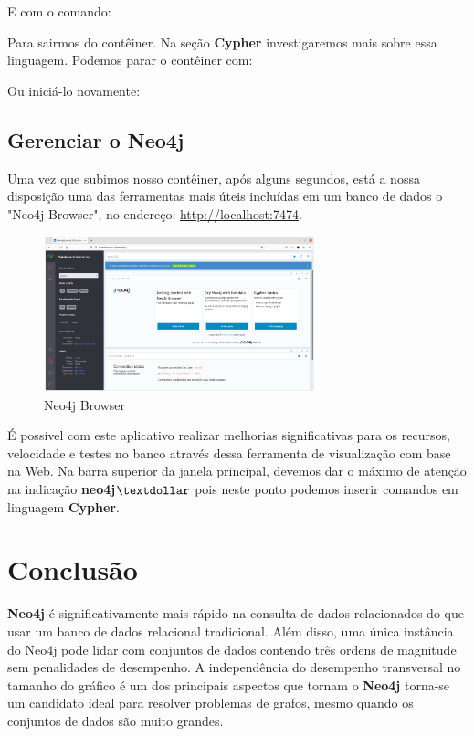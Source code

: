 \documentclass[a4paper,11pt]{article}
\begin{document}
E com o comando: \\

Para sairmos do contêiner. Na seção \textbf{Cypher} investigaremos mais sobre essa linguagem. Podemos parar o contêiner com: \\

Ou iniciá-lo novamente: \\

\subsection{Gerenciar o Neo4j}
Uma vez que subimos nosso contêiner, após alguns segundos, está a nossa disposição uma das ferramentas mais úteis incluídas em um banco de dados o "Neo4j Browser", no endereço: \url{http://localhost:7474}.
\begin{figure}[H]
	\centering
	\includegraphics[width=0.7\textwidth]{imagens/browser}
	\caption{Neo4j Browser}
\end{figure}

É possível com este aplicativo realizar melhorias significativas para os recursos, velocidade e testes no banco através dessa ferramenta de visualização com base na Web. Na barra superior da janela principal, devemos dar o máximo de atenção na indicação \textbf{neo4j$\textdollar$ }pois neste ponto podemos inserir comandos em linguagem \textbf{Cypher}.





\section{Conclusão}
\textbf{Neo4j} é significativamente mais rápido na consulta de dados relacionados do que usar um banco de dados relacional tradicional. Além disso, uma única instância do Neo4j pode lidar com conjuntos de dados contendo três ordens de magnitude sem penalidades de desempenho. A independência do desempenho transversal no tamanho do gráfico é um dos principais aspectos que tornam o \textbf{Neo4j} torna-se um candidato ideal para resolver problemas de grafos, mesmo quando os conjuntos de dados são muito grandes.
\end{document}
